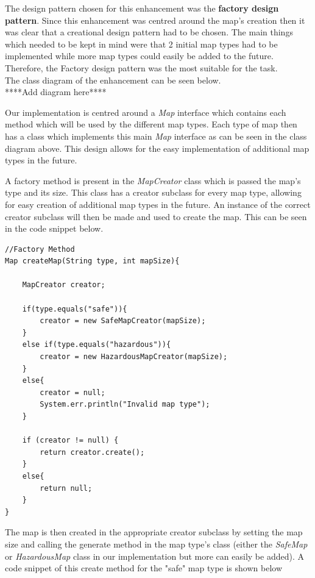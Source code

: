 \documentclass[a4paper,12pt]{extarticle}
\begin{document}
The design pattern chosen for this enhancement was the \textbf{factory design pattern}. Since this enhancement was centred around the map's creation then it was clear that a creational design pattern had to be chosen. The main things which needed to be kept in mind were that 2 initial map types had to be implemented while more map types could easily be added to the future. Therefore, the Factory design pattern was the most suitable for the task.\\

The class diagram of the enhancement can be seen below.\\

****Add diagram here****\\
\newpage

\noindent Our implementation is centred around a \textit{Map} interface which contains each method which will be used by the different map types. Each type of map then has a class which implements this main \textit{Map} interface as can be seen in the class diagram above. This design allows for the easy implementation of additional map types in the future.\par

A factory method is present in the \textit{MapCreator} class which is passed the map's type and its size. This class has a creator subclass for every map type, allowing for easy creation of additional map types in the future. An instance of the correct creator subclass will then be made and used to create the map. This can be seen in the code snippet below.

\vspace{-1mm}
\begin{lstlisting}
//Factory Method
Map createMap(String type, int mapSize){

    MapCreator creator;

    if(type.equals("safe")){
        creator = new SafeMapCreator(mapSize);
    }
    else if(type.equals("hazardous")){
        creator = new HazardousMapCreator(mapSize);
    }
    else{
        creator = null;
        System.err.println("Invalid map type");
    }

    if (creator != null) {
        return creator.create();
    }
    else{
        return null;
    }
}
\end{lstlisting}
\vspace{4mm}

\noindent The map is then created in the appropriate creator subclass by setting the map size and calling the generate method in the map type's class (either the \textit{SafeMap} or \textit{HazardousMap} class in our implementation but more can easily be added). A code snippet of this create method for the "safe" map type is shown below
\end{document}
